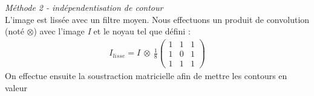 \documentclass{article}
\begin{document}
			\indent	\emph{Méthode 2 - indépendentisation de contour}\\
			L'image est lissée avec un filtre moyen. Nous effectuons un produit de convolution (noté \begin{math}\otimes\end{math}) avec l'image \emph{I} et le noyau tel que défini :
			\begin{align*}
				I_{lisse} = I\ \otimes\ \frac{1}{8} \begin{pmatrix}
					1 & 1 & 1\\
					1 & 0 & 1\\
					1 & 1 & 1
				\end{pmatrix} 
			\end{align*}
			On effectue ensuite la soustraction matricielle afin de mettre les contours en valeur
			
	
	\newpage
	
	
	
\end{document}
